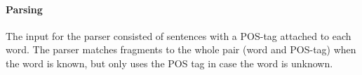 \paragraph{Parsing}
The input for the parser consisted of sentences with a POS-tag attached to each word. The parser matches fragments to the whole pair (word and POS-tag) when the word is known, but only uses the POS tag in case the word is unknown.






